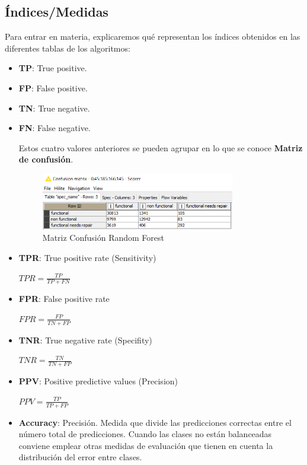 	\subsection{Índices/Medidas}
	\hspace{1cm} Para entrar en materia, explicaremos qué representan los índices obtenidos en las diferentes tablas de los algoritmos:
	
	\begin{itemize}
		\item \textbf{TP}: True positive.
		\item \textbf{FP}: False positive.
		\item \textbf{TN}: True negative.
		\item \textbf{FN}: False negative.
		
		Estos cuatro valores anteriores se pueden agrupar en lo que se conoce \textbf{Matriz de confusión}.
		
		\begin{figure}[H]
			\centering
			\includegraphics[width=0.8\textwidth]{img/confusion.png}
			\caption{Matriz Confusión Random Forest}
		\end{figure}
		
		\item \textbf{TPR}: True positive rate (Sensitivity)
		
		$TPR=\frac{TP}{TP+FN}$
		\item \textbf{FPR}: False positive rate
		
		$FPR=\frac{FP}{TN+FP}$
		
		\item \textbf{TNR}: True negative rate (Specifity)
		
		$TNR=\frac{TN}{TN+FP}$
		
		\item \textbf{PPV}: Positive predictive values (Precision)
		
		$PPV=\frac{TP}{TP+FP}$
		
		\item \textbf{Accuracy}: Precisión. Medida que divide las predicciones correctas entre el número total de predicciones. Cuando las clases no están balanceadas conviene emplear otras medidas de evaluación que tienen en cuenta la distribución del error entre clases.
		

\end{itemize}
